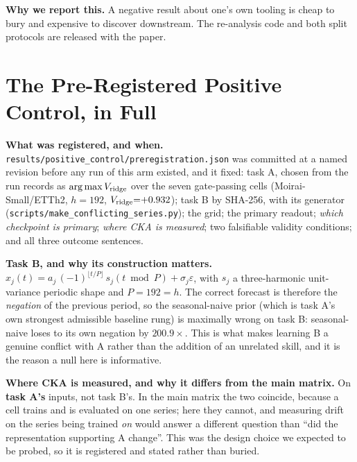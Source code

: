 \textbf{Why we report this.} A negative result about one's own tooling is
cheap to bury and expensive to discover downstream. The re-analysis code and
both split protocols are released with the paper.

\section{The Pre-Registered Positive Control, in Full}
\label{app:poscontrol}

\textbf{What was registered, and when.}
\texttt{results/positive\_control/\allowbreak preregistration.json} was committed at a named
revision before any run of this arm existed, and it fixed: task A, chosen from the
run records as $\arg\max V_{\text{ridge}}$ over the seven gate-passing cells
(Moirai-Small/ETTh2, $h{=}192$, $V_{\text{ridge}}{=}{+}0.932$); task B by
SHA-256, with its generator (\texttt{scripts/make\_conflicting\_series.py}); the
grid; the primary readout; \emph{which checkpoint is primary}; \emph{where CKA is
measured}; two falsifiable validity conditions; and all three outcome sentences.

\textbf{Task B, and why its construction matters.} $x_j(t) = a_j\,(-1)^{\lfloor
t/P\rfloor}\,s_j(t \bmod P) + \sigma_j\varepsilon$, with $s_j$ a three-harmonic
unit-variance periodic shape and $P{=}192{=}h$.  The correct forecast is
therefore the \emph{negation} of the previous period, so the seasonal-naive
prior (which is task A's own strongest admissible baseline rung) is maximally
wrong on task B: seasonal-naive loses to its own negation by $200.9\times$.  This
is what makes learning B a genuine conflict with A rather than the addition of an
unrelated skill, and it is the reason a null here is informative.

\textbf{Where CKA is measured, and why it differs from the main matrix.} On
\textbf{task A's} inputs, not task B's.  In the main matrix the two coincide,
because a cell trains and is evaluated on one series; here they cannot, and
measuring drift on the series being trained \emph{on} would answer a different
question than ``did the representation supporting A change''.  This was the
design choice we expected to be probed, so it is registered and stated rather
than buried.

